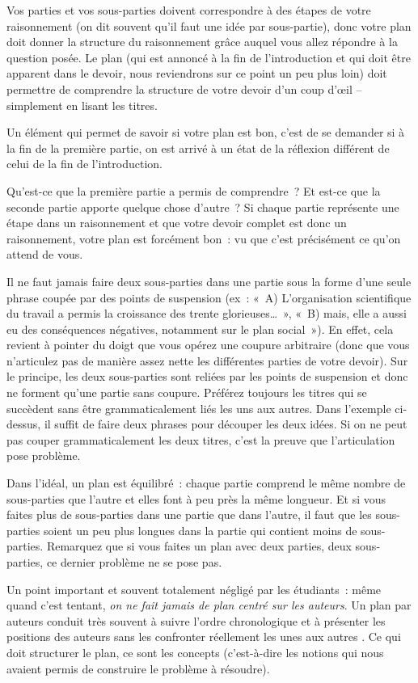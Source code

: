 \documentclass[
  letterpaper,
  DIV=11,
  numbers=noendperiod]{scrartcl}
\begin{document}
Vos parties et vos sous-parties doivent correspondre à des étapes de
votre raisonnement (on dit souvent qu'il faut une idée par sous-partie),
donc votre plan doit donner la structure du raisonnement grâce auquel
vous allez répondre à la question posée. Le plan (qui est annoncé à la
fin de l'introduction et qui doit être apparent dans le devoir, nous
reviendrons sur ce point un peu plus loin) doit permettre de comprendre
la structure de votre devoir d'un coup d'œil -- simplement en lisant les
titres.

Un élément qui permet de savoir si votre plan est bon, c'est de se
demander si à la fin de la première partie, on est arrivé à un état de
la réflexion différent de celui de la fin de l'introduction.

Qu'est-ce que la première partie a permis de comprendre~? Et est-ce que
la seconde partie apporte quelque chose d'autre~? Si chaque partie
représente une étape dans un raisonnement et que votre devoir complet
est donc un raisonnement, votre plan est forcément bon~: vu que c'est
précisément ce qu'on attend de vous.

Il ne faut jamais faire deux sous-parties dans une partie sous la forme
d'une seule phrase coupée par des points de suspension (ex~: «~A)
L'organisation scientifique du travail a permis la croissance des trente
glorieuses\ldots~», «~B) mais, elle a aussi eu des conséquences
négatives, notamment sur le plan social~»). En effet, cela revient à
pointer du doigt que vous opérez une coupure arbitraire (donc que vous
n'articulez pas de manière assez nette les différentes parties de votre
devoir). Sur le principe, les deux sous-parties sont reliées par les
points de suspension et donc ne forment qu'une partie sans coupure.
Préférez toujours les titres qui se succèdent sans être grammaticalement
liés les uns aux autres. Dans l'exemple ci-dessus, il suffit de faire
deux phrases pour découper les deux idées. Si on ne peut pas couper
grammaticalement les deux titres, c'est la preuve que l'articulation
pose problème.

Dans l'idéal, un plan est équilibré~: chaque partie comprend le même
nombre de sous-parties que l'autre et elles font à peu près la même
longueur. Et si vous faites plus de sous-parties dans une partie que
dans l'autre, il faut que les sous-parties soient un peu plus longues
dans la partie qui contient moins de sous-parties. Remarquez que si vous
faites un plan avec deux parties, deux sous-parties, ce dernier problème
ne se pose pas.

Un point important et souvent totalement négligé par les étudiants~:
même quand c'est tentant, \emph{on ne fait jamais de plan centré sur les
auteurs}. Un plan par auteurs conduit très souvent à suivre l'ordre
chronologique et à présenter les positions des auteurs sans les
confronter réellement les unes aux autres . Ce qui doit structurer le
plan, ce sont les concepts (c'est-à-dire les notions qui nous avaient
permis de construire le problème à résoudre).
\end{document}
